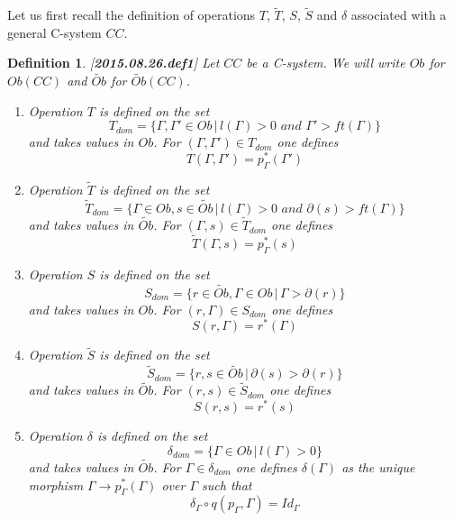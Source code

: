 \documentclass[11pt]{article}
\newtheorem{definition}[proposition]{Definition}
\newcommand{\llabel}[1]{\label{#1}[{\bf #1}]}
\newcommand{\sr}{\rightarrow}
\newcommand{\wt}{\widetilde}
\begin{document}
Let us first recall the definition of operations $T$, $\wt{T}$, $S$, $\wt{S}$ and $\delta$ associated with a general C-system $CC$. 
%
\begin{definition}
\llabel{2015.08.26.def1}
Let $CC$ be a C-system. We will write $Ob$ for $Ob(CC)$ and $\wt{Ob}$ for $\wt{Ob}(CC)$. 
%
%
\begin{enumerate}
\item Operation $T$ is defined on the set
%
$$T_{dom}=\{\Gamma,\Gamma'\in Ob\,|\,l(\Gamma)>0\,\,and\,\, \Gamma'>ft(\Gamma)\}$$
%
and takes values in $Ob$. For $(\Gamma,\Gamma')\in T_{dom}$ one defines
%
$$T(\Gamma,\Gamma')=p_{\Gamma}^*(\Gamma')$$
%
\item Operation $\wt{T}$ is defined on the set
%
$$\wt{T}_{dom}=\{\Gamma\in Ob, s\in \wt{Ob}\,|\,l(\Gamma)>0\,\,and\,\, \partial(s)>ft(\Gamma)\}$$
%
and takes values in $\wt{Ob}$. For $(\Gamma,s)\in \wt{T}_{dom}$ one defines
%
$$\wt{T}(\Gamma,s)=p_{\Gamma}^*(s)$$
%
\item Operation $S$ is defined on the set
%
$$S_{dom}=\{r\in \wt{Ob}, \Gamma\in Ob\,|\,\Gamma>\partial(r)\}$$
%
and takes values in $Ob$. For $(r,\Gamma)\in S_{dom}$ one defines
%
$$S(r,\Gamma)=r^*(\Gamma)$$
%
\item Operation $\wt{S}$ is defined on the set 
%
$$\wt{S}_{dom}=\{r,s\in \wt{Ob}\,|\,\partial(s)>\partial(r)\}$$
%
and takes values in $\wt{Ob}$. For $(r,s)\in \wt{S}_{dom}$ one defines
%
$$S(r,s)=r^*(s)$$
%
\item Operation $\delta$ is defined on the set 
%
$$\delta_{dom}=\{\Gamma\in Ob\,|\,l(\Gamma)>0\}$$
%
and takes values in $\wt{Ob}$. For $\Gamma\in \delta_{dom}$ one defines $\delta(\Gamma)$ as the unique morphism $\Gamma\sr p_{\Gamma}^*(\Gamma)$ over $\Gamma$ such that 
%
$$\delta_{\Gamma}\circ q(p_{\Gamma},\Gamma)=Id_{\Gamma}$$
%
\end{enumerate}
\end{definition}
%
\end{document}

